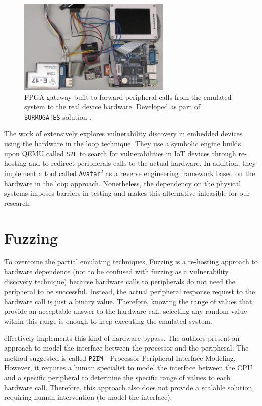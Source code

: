 \begin{figure}[H]
    \centering
    \includegraphics[width=0.65\textwidth]{figs/surrogates.png}
    \caption{FPGA gateway built to forward peripheral calls from the emulated system to the real device hardware. Developed as part of {\tt SURROGATES} solution \cite{surrogates}.}
    \label{fig:surrogates}
\end{figure}
The work of \cite{avatar2} extensively explores vulnerability discovery in embedded devices using the hardware in the loop technique. They use a symbolic engine builds upon QEMU called {\tt S2E} to search for vulnerabilities in IoT devices through re-hosting and to redirect peripherals calls to the actual hardware. In addition, they implement a tool called {\tt Avatar$^2$} as a reverse engineering framework based on the hardware in the loop approach.  Nonetheless, the dependency on the physical systems imposes barriers in testing and makes this alternative infeasible for our research.

\section{Fuzzing}

To overcome the partial emulating techniques, Fuzzing is a re-hosting approach to hardware dependence (not to be confused with fuzzing as a vulnerability discovery technique) because hardware calls to peripherals do not need the peripheral to be successful. Instead, the actual peripheral response request to the hardware call is just a binary value. Therefore, knowing the range of values that provide an acceptable answer to the hardware call, selecting any random value within this range is enough to keep executing the emulated system.

\cite{p2im} effectively implements this kind of hardware bypass.  The authors present an approach to model the interface between the processor and the peripheral. The method suggested is called {\tt P2IM} - Processor-Peripheral Interface Modeling.  However, it requires a human specialist to model the interface between the CPU and a specific peripheral to determine the specific range of values to each hardware call. Therefore, this approach also does not provide a scalable solution, requiring human intervention (to model the interface).

